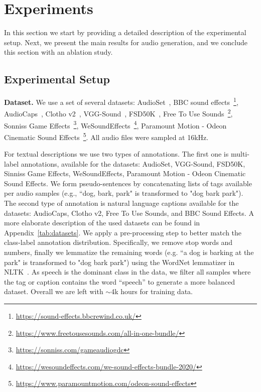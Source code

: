 \section{Experiments}
\label{sec:exp}
In this section we start by providing a detailed description of the experimental setup. Next, we present the main results for audio generation, and we conclude this section with an ablation study.

\subsection{Experimental Setup}
\label{sec:setup}
{\noindent \bf{Dataset.}} We use a set of several datasets: AudioSet~\citep{gemmeke2017audio}, BBC sound effects~\footnote{\url{https://sound-effects.bbcrewind.co.uk/}}, AudioCaps~\citep{kim2019audiocaps}, Clotho v2~\citep{drossos2020clotho}, VGG-Sound~\citep{chen2020vggsound}, FSD50K~\citep{fonseca2021fsd50k}, Free To Use Sounds~\footnote{\url{https://www.freetousesounds.com/all-in-one-bundle/}}, Sonniss Game Effects~\footnote{\url{https://sonniss.com/gameaudiogdc}}, WeSoundEffects~\footnote{\url{https://wesoundeffects.com/we-sound-effects-bundle-2020/}}, Paramount Motion - Odeon Cinematic Sound Effects~\footnote{\url{https://www.paramountmotion.com/odeon-sound-effects}}. All audio files were sampled at 16kHz.

For textual descriptions we use two types of annotations. The first one is multi-label annotations, available for the datasets: AudioSet, VGG-Sound, FSD50K, Sinniss Game Effects, WeSoundEffects, Paramount Motion - Odeon Cinematic Sound Effects. We form pseudo-sentences by concatenating lists of tags available per audio samples (e.g., ``dog, bark, park" is transformed to "dog bark park"). The second type of annotation is natural language captions available for the datasets: AudioCaps, Clotho v2, Free To Use Sounds, and BBC Sound Effects. A more elaborate description of the used datasets can be found in Appendix~\ref{tab:datasets}.
We apply a pre-processing step to better match the class-label annotation distribution. Specifically, we remove stop words and numbers, finally we lemmatize the remaining words (e.g. ``a dog is barking at the park" is transformed to "dog bark park") using the WordNet lemmatizer in NLTK~\citep{bird2009natural}. As speech is the dominant class in the data, we filter all samples where the tag or caption contains the word ``speech'' to generate a more balanced dataset. Overall we are left with $\sim$4k hours for training data.


